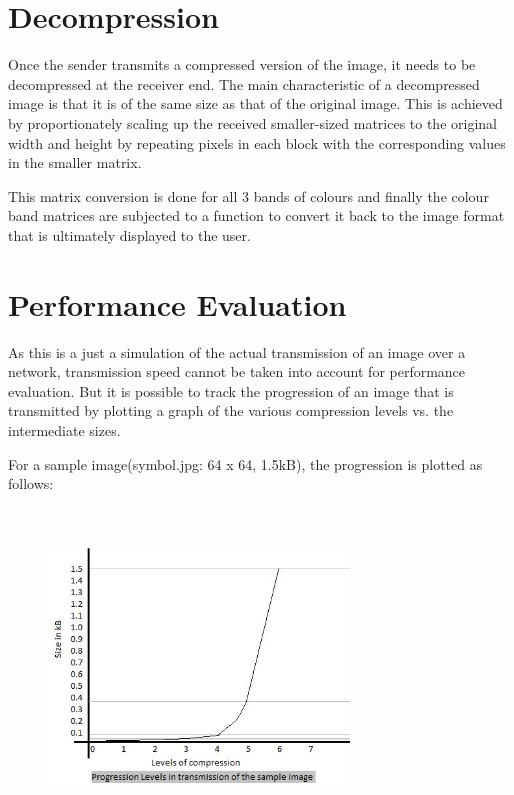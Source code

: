 \documentclass[twocolumn,12pt]{article}
\begin{document}
\section{Decompression}

Once the sender transmits a compressed version of the image, it needs to be decompressed at the receiver end. The main characteristic of a decompressed image is that it is of the same size as that of the original image. This is achieved by proportionately scaling up the received smaller-sized matrices to the original width and height by repeating pixels in each block with the corresponding values in the smaller matrix. 
	
This matrix conversion is done for all 3 bands of colours and finally the colour band matrices are subjected to a function to convert it back to the image format that is ultimately displayed to the user. 

\section{Performance Evaluation}

As this is a just a simulation of the actual transmission of an image over a network, transmission speed cannot be taken into account for performance evaluation. But it is possible to track the progression of an image that is transmitted by plotting a graph of the various compression levels vs. the intermediate sizes.

For a sample image(symbol.jpg: 64 x 64, 1.5kB), the progression is plotted as follows:\\\\\\

\begin{figure}[ht!]
\centering
\includegraphics[width=80mm]{g1.jpg}
\end{figure}
\end{document}
